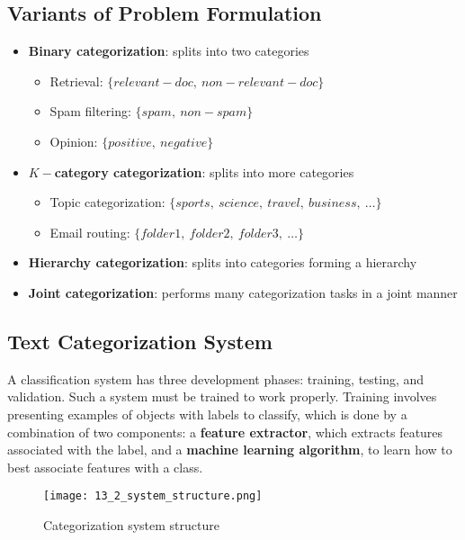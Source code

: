 \documentclass{article}
\begin{document}
\subsection{Variants of Problem Formulation}
\begin{itemize}
    \item \textbf{Binary categorization}: splits into two categories
        \begin{itemize}
            \item Retrieval: $\{relevant-doc, \ non-relevant-doc\}$
            \item Spam filtering: $\{spam, \ non-spam\}$
            \item Opinion: $\{positive, \ negative\} $
        \end{itemize}
    \item \textbf{$K-$category categorization}: splits into more categories
        \begin{itemize}
            \item Topic categorization: $\{sports, \ science, \ travel, \ business, \ \dots\}$
            \item Email routing: $\{folder1, \ folder2, \ folder3, \ \dots \}$
        \end{itemize}
    \item \textbf{Hierarchy categorization}: splits into categories forming a hierarchy
    \item \textbf{Joint categorization}: performs many categorization tasks in a joint manner
\end{itemize}

\subsection{Text Categorization System}
A classification system has three development phases: training, testing, and validation. Such a system must be trained to work properly. Training involves presenting examples of objects with labels to classify, which is done by a combination of two components: a \textbf{feature extractor}, which extracts features associated with the label, and a \textbf{machine learning algorithm}, to learn how to best associate features with a class. 
\begin{figure}[H]
    \centering
    \texttt{[image: 13\_2\_system\_structure.png]}
    \caption{Categorization system structure}
\end{figure}

\newpage
\end{document}
